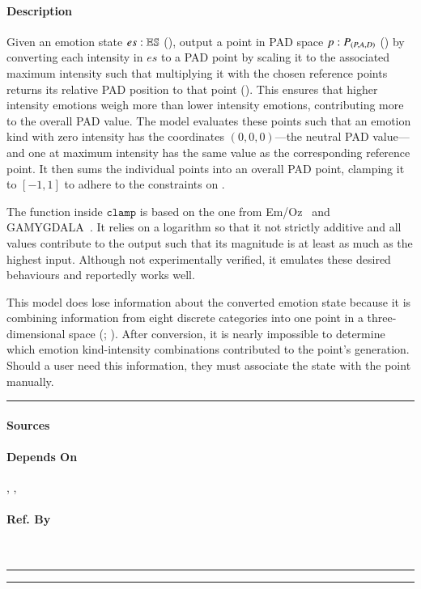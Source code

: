 \paragraph{Description} Given an emotion state $es : \mathbb{ES}$
(), output a point in PAD space $p : P_{\left(P,A,D\right)}$
() by converting each intensity in $es$ to a PAD point by scaling
it to the associated maximum intensity such that multiplying it with the chosen
reference points returns its relative PAD position to that point
(). This ensures that higher intensity emotions
weigh more than lower intensity emotions, contributing more to the overall PAD
value. The model evaluates these points such that an emotion kind with zero
intensity has the coordinates $(0, 0, 0)$---the neutral PAD value---and one at
maximum intensity has the same value as the corresponding reference point. It
then sums the individual points into an overall PAD point, clamping it to $[-1,
1]$ to adhere to the constraints on .

The function inside $\mathtt{clamp}$ is based on the one from
Em/Oz~\citep{reilly2006modelling} and
GAMYGDALA~\citep[p.~38]{popescu2014gamygdala}. It relies on a logarithm so that
it not strictly additive and all values contribute to the output such that its
magnitude is at least as much as the highest input. Although not experimentally
verified, it emulates these desired behaviours and reportedly works well.

This model does lose information about the converted emotion state because it
is combining information from eight discrete categories into one point in a
three-dimensional space (;
). After conversion, it is nearly impossible
to determine which emotion kind-intensity combinations contributed to the
point's generation. Should a user need this information, they must associate
the state with the point manually. \\\hrule

\paragraph{Sources} \citet[p.~40, 42--45]{mehrabian1980basic}

\paragraph{Depends On} , ,

\paragraph{Ref. By}  \\\hrule\vspace{0.5mm}\hrule